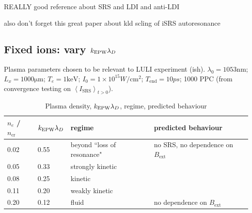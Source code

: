 \citep{Feng2018} REALLY good reference about SRS and LDI and anti-LDI

also don't forget this great paper about kld scling of iSRS autoresonance \citep{Chapman2013}

\subsection{Fixed ions: vary $k_\mathrm{EPW}\lambda_D$}

Plasma parameters chosen to be relevant to LULI experiment (ish). $\lambda_0 = 1053 \si{\nano\metre}$; $L_x = 1000 \si{\micro\metre}$; $T_e = 1 \si{\kilo\electronvolt}$; $I_0 = 1\times 10^{15}\si{W/\cm^2}$; $T_{\mathrm{end}}=10 \si{ps}$; 1000 PPC (from convergence testing on $\left< I_{\mathrm{SRS}} \right>_{t>0}$).

\begin{table}[h]
\begin{center}

\begin{tabular}{|l|l|l|l|}
\hline
$n_e$ / $n_{\mathrm{cr}}$ & $k_\mathrm{EPW}\lambda_D$ & regime & predicted behaviour\\ \hline \hline
0.02 & 0.55 & beyond ``loss of resonance" & no SRS, no dependence on $B_{\mathrm{ext}}$  \\ \hline
0.05 & 0.33 & strongly kinetic &  \\ \hline
0.08 & 0.25 & kinetic &  \\ \hline
0.11 & 0.20 & weakly kinetic & \\ \hline
0.20 & 0.12 & fluid & no dependence on $B_{\mathrm{ext}}$\\ \hline

\end{tabular}

\end{center}
\caption{Plasma density, $k_\mathrm{EPW}\lambda_D$, regime, predicted behaviour}
\label{tab:predictions}
\end{table}

